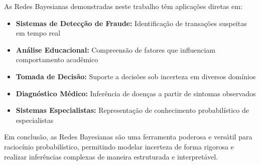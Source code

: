 \documentclass[a4paper,12pt]{article}
\begin{document}
As Redes Bayesianas demonstradas neste trabalho têm aplicações diretas em:
\begin{itemize}
    \item \textbf{Sistemas de Detecção de Fraude:} Identificação de transações suspeitas em tempo real
    \item \textbf{Análise Educacional:} Compreensão de fatores que influenciam comportamento acadêmico
    \item \textbf{Tomada de Decisão:} Suporte a decisões sob incerteza em diversos domínios
    \item \textbf{Diagnóstico Médico:} Inferência de doenças a partir de sintomas observados
    \item \textbf{Sistemas Especialistas:} Representação de conhecimento probabilístico de especialistas
\end{itemize}

Em conclusão, as Redes Bayesianas são uma ferramenta poderosa e versátil para raciocínio probabilístico, permitindo modelar incerteza de forma rigorosa e realizar inferências complexas de maneira estruturada e interpretável.


\appendix




\end{document}

